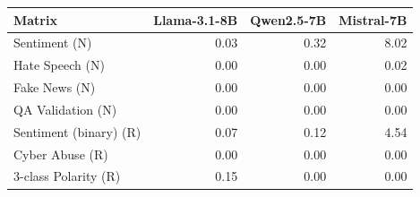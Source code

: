 \begin{tabular}{lrrr}
\toprule
Matrix & Llama-3.1-8B & Qwen2.5-7B & Mistral-7B \\
\midrule
Sentiment (N) & 0.03 & 0.32 & 8.02 \\
Hate Speech (N) & 0.00 & 0.00 & 0.02 \\
Fake News (N) & 0.00 & 0.00 & 0.00 \\
QA Validation (N) & 0.00 & 0.00 & 0.00 \\
Sentiment (binary) (R) & 0.07 & 0.12 & 4.54 \\
Cyber Abuse (R) & 0.00 & 0.00 & 0.00 \\
3-class Polarity (R) & 0.15 & 0.00 & 0.00 \\
\bottomrule
\end{tabular}
